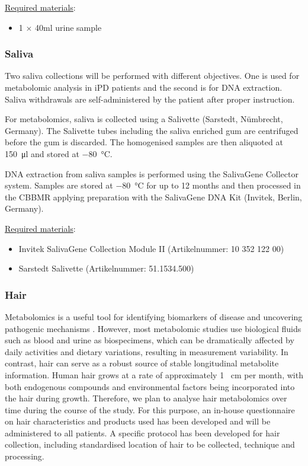 \noindent \underline{Required materials}:
\begin{itemize}
  \item 1 $\times$ 40ml urine sample
\end{itemize}

\subsubsection{Saliva}
\label{biosamples:saliva}
Two saliva collections will be performed with different objectives. One is used for metabolomic analysis in \ac{iPD} patients and the second is for DNA extraction. Saliva withdrawals are self-administered by the patient after proper instruction.

For metabolomics, saliva is collected using a Salivette\regd{} (Sarstedt, Nümbrecht, Germany). The Salivette tubes including the saliva enriched gum are centrifuged before the gum is discarded.  The homogenised samples are then aliquoted at \SI[round-precision = 0, round-mode = places]{150}{\micro\litre} and stored at \SI[round-precision = 0, round-mode = places]{-80}{\degreeCelsius}.

DNA extraction from saliva samples is performed using the SalivaGene Collector system. Samples are stored at \SI[round-precision = 0, round-mode = places]{-80}{\degreeCelsius} for up to \num[round-precision = 0, round-mode = places]{12} months and then processed in the \ac{CBBMR} applying preparation with the SalivaGene DNA Kit (Invitek, Berlin, Germany).

\noindent \underline{Required materials}:
\begin{itemize}
\item Invitek SalivaGene Collection Module II (Artikelnummer: 10 352 122 00)
\item Sarstedt Salivette (Artikelnummer: 51.1534.500)
\end{itemize}

\subsubsection{Hair}
\label{biosamples:hair}
Metabolomics is a useful tool for identifying biomarkers of disease and uncovering pathogenic mechanisms \cite{Chen2021}. However, most metabolomic studies use biological fluids such as blood and urine as biospecimens, which can be dramatically affected by daily activities and dietary variations, resulting in measurement variability. In contrast, hair can serve as a robust source of stable longitudinal metabolite information. Human hair grows at a rate of approximately \num{1} \SI{}{\centi\metre} per month, with both endogenous compounds and environmental factors being incorporated into the hair during growth. Therefore, we plan to analyse hair metabolomics over time during the course of the study. For this purpose, an in-house questionnaire on hair characteristics and products used has been developed and will be administered to all patients. A specific protocol has been developed for hair collection, including standardised location of hair to be collected, technique and processing. 

